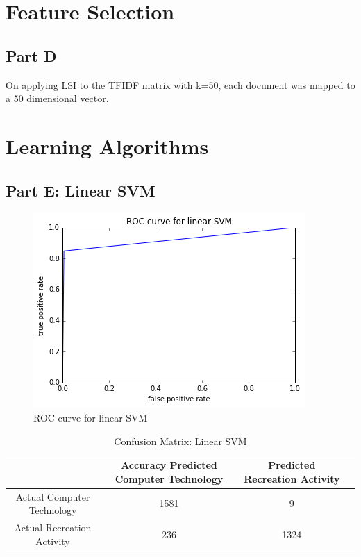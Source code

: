 \documentclass[11pt]{article}
\begin{document}
\section{Feature Selection}
\subsection{Part D}
On applying LSI to the TFIDF matrix with k=50, each document was mapped to a 50 dimensional vector. 

\section{Learning Algorithms}
\subsection{Part E: Linear SVM}

\begin{figure}[!h]
	
		\includegraphics[width=\textwidth]{ROC_SVM.png}
	\caption{ROC curve for linear SVM}
\end{figure}

\begin{table}[h]
	\centering
	\begin{tabular}{|c|c|c|c|} \hline
		& Accuracy 		Predicted Computer Technology & Predicted Recreation Activity \\ \hline
		Actual Computer Technology & 1581 & 9 \\
		Actual Recreation Activity & 236& 1324  \\
		\hline
	\end{tabular}
	\caption{Confusion Matrix: Linear SVM}
	\label{table:ovr_res}
\end{table}
\end{document}
